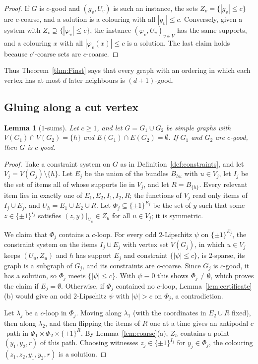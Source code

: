 \documentclass[11pt,letterpaper]{article}
\newtheorem{lemma}[theorem]{Lemma}
\theoremstyle{definition}
\newcommand{\cube}[1]{\{\pm1\}^{#1}}
\begin{document}
\begin{proof}
If $G$ is $c$-good and $(g_v,U_v)$ is such an instance, the sets $Z_v=\{|g_v|\le c\}$ are
$c$-coarse, and a solution is a colouring with all $|g_v|\le c$. Conversely, given a system with
$Z_v\supseteq\{|\varphi_v|\le c\}$, the instance $(\varphi_v,U_v)_{v\in V}$ has the same supports,
and a colouring $x$ with all $|\varphi_v(x)|\le c$ is a solution. The last claim holds because
$c'$-coarse sets are $c$-coarse.
\end{proof}

Thus Theorem~\ref{thm:Finst} says that every graph with an ordering in which each vertex has at
most $d$ later neighbours is $(d+1)$-good.

\subsection{Gluing along a cut vertex}

\begin{lemma}[$1$-sums]\label{lem:onesum}
Let $c\ge1$, and let $G=G_1\cup G_2$ be simple graphs with $V(G_1)\cap V(G_2)=\{h\}$ and
$E(G_1)\cap E(G_2)=\emptyset$. If $G_1$ and $G_2$ are $c$-good, then $G$ is $c$-good.
\end{lemma}

\begin{proof}
Take a constraint system on $G$ as in Definition~\ref{def:constraints}, and let
$V_j=V(G_j)\setminus\{h\}$. Let $E_j$ be the union of the bundles $B_{hu}$ with $u\in V_j$, let
$I_j$ be the set of items all of whose supports lie in $V_j$, and let $R=B_{\{h\}}$. Every
relevant item lies in exactly one of $E_1,E_2,I_1,I_2,R$; the functions of $V_j$ read only items
of $I_j\cup E_j$, and $U_h=E_1\cup E_2\cup R$. Let $\Phi_j\subseteq\cube{E_j}$ be the set of $y$
such that some $z\in\cube{I_j}$ satisfies $(z,y)|_{U_u}\in Z_u$ for all $u\in V_j$; it is
symmetric.

We claim that $\Phi_j$ contains a $c$-loop. For every odd $2$-Lipschitz $\psi$ on $\cube{E_j}$,
the constraint system on the items $I_j\cup E_j$ with vertex set $V(G_j)$, in which $u\in V_j$
keeps $(U_u,Z_u)$ and $h$ has support $E_j$ and constraint $\{|\psi|\le c\}$, is $2$-sparse, its
graph is a subgraph of $G_j$, and its constraints are $c$-coarse. Since $G_j$ is $c$-good, it has a
solution, so $\Phi_j$ meets $\{|\psi|\le c\}$. With $\psi\equiv0$ this shows $\Phi_j\ne\emptyset$,
which proves the claim if $E_j=\emptyset$. Otherwise, if $\Phi_j$ contained no $c$-loop,
Lemma~\ref{lem:certificate}(b) would give an odd $2$-Lipschitz $\psi$ with $|\psi|>c$ on $\Phi_j$, a
contradiction.

Let $\lambda_j$ be a $c$-loop in $\Phi_j$. Moving along $\lambda_1$ (with the coordinates in
$E_2\cup R$ fixed), then along $\lambda_2$, and then flipping the items of $R$ one at a time gives an
antipodal $c$-path in $\Phi_1\times\Phi_2\times\cube R$. By Lemma~\ref{lem:coarse}(a), $Z_h$ contains
a point $(y_1,y_2,r)$ of this path. Choosing witnesses $z_j\in\cube{I_j}$ for $y_j\in\Phi_j$, the
colouring $(z_1,z_2,y_1,y_2,r)$ is a solution.
\end{proof}
\end{document}
